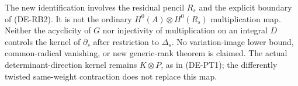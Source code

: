 \begin{remark}
\label{rem:DE-A3-residual-pencil-boundary-scope}
The new identification involves the residual pencil $R_s$ and
the explicit boundary of (DE-RB2). It is not the ordinary
$H^0(A)\otimes H^0(R_s)$ multiplication map. Neither the
acyclicity of $G$ nor injectivity of multiplication on an
integral $D$ controls the kernel of $\partial_s$ after
restriction to $\Delta_s$. No variation-image lower bound,
common-radical vanishing, or new generic-rank theorem is claimed.
The actual determinant-direction kernel remains $K\otimes P$, as in
(DE-PT1); the differently twisted same-weight contraction does not
replace this map.
\end{remark}
